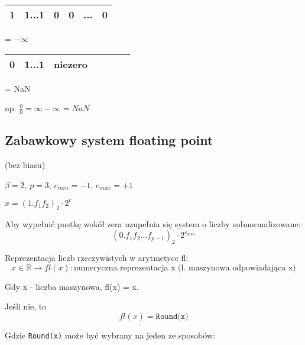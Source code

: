 \documentclass[hidelinks,a4paper,fleqn,oneside]{book}
\begin{document}
\begin{tabular}{|c|c|l|l|l|c|c|c|l|c|}
	\hline
	1 & \multicolumn{4}{c|}{1...1} & 0 & 0 & \multicolumn{2}{c|}{...} & 0 \\ \hline
\end{tabular} = $-\infty$

\begin{tabular}{|c|c|l|l|l|c|c|c|l|c|}
	\hline
	0 & \multicolumn{4}{c|}{1...1} & niezero \\ \hline
\end{tabular} = NaN

np. $\frac{0}{0} = \infty - \infty = NaN$

\subsection{Zabawkowy system floating point}

(bez biasu)

$\beta = 2$, $p = 3$, $e_{min} = -1$, $e_{max} = +1$

$x = (1.f_1f_2)_2 \cdot 2^{e}$



Aby wypełnić pustkę wokół zera uzupełnia się system o liczby subnormalizowane:
\[
	(0.f_1f_2...f_{p-1})_2 \cdot 2^{e_{min}}
\]

Reprezentacja liczb rzeczywistych w arytmetyce fl:
\[
	x \in \mathbb{R} \rightarrow fl(x) : \textrm{numeryczna reprezentacja x (l. maszynowa odpowiadająca x)}
\]

Gdy x - liczba maszynowa, fl(x) = x.

Jeśli nie, to
\[
	fl(x) = \texttt{Round(x)}
\]

Gdzie \texttt{Round(x)} może być wybrany na jeden ze sposobów:
\end{document}
